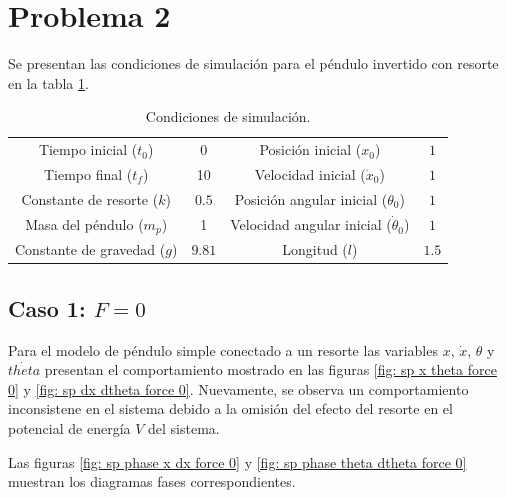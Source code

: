 \documentclass[12pt,letterpaper]{article}
\begin{document}
\section{Problema 2}

Se presentan las condiciones de simulación para el péndulo invertido con resorte en la tabla \ref{table: sp initial conditions}. 

\begin{table}[h]
\begin{center}
\centering
\begin{tabular}{cccc}
\hline
Tiempo inicial ($t_0$) & 0  & Posición inicial ($x_0$) & $1$ \\
Tiempo final ($t_f$) & 10 & Velocidad inicial ($\dot{x}_0$)& $1$\\
 Constante de resorte ($k$) & $0.5$ &  Posición angular inicial ($\theta_0$) & $1$\\
Masa del péndulo ($m_p$) & 1 & Velocidad angular inicial ($\dot{\theta}_0$)& $1$\\
Constante de gravedad ($g$) & $9.81$ & Longitud ($l$) & $1.5$ \\
\hline
\end{tabular}
\end{center}
 \caption{Condiciones de simulación.}
 \label{table: sp initial conditions}
\end{table}

\subsection{Caso 1: $F=0$}

Para el modelo de péndulo simple conectado a un resorte las variables $x$, $\dot{x}$, $\theta$ y $\dot{theta}$ presentan el comportamiento mostrado en las figuras \ref{fig: sp x theta force 0} y \ref{fig: sp dx dtheta force 0}. Nuevamente, se observa un comportamiento inconsistene en el sistema debido a la 
omisión del efecto del resorte en el potencial de energía $V$ del sistema.

Las figuras  \ref{fig: sp phase x dx force 0} y \ref{fig: sp phase theta dtheta force 0} muestran
los diagramas fases correspondientes.
\end{document}
